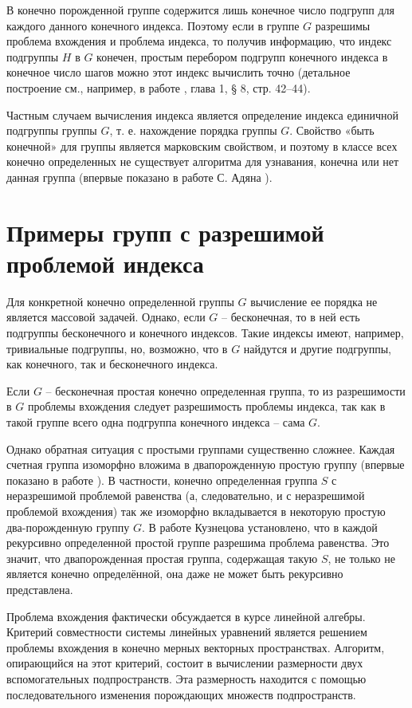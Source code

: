 \documentclass[twoside]{mfitjournal}
\begin{document}
В конечно порожденной группе содержится лишь конечное число подгрупп для каждого данного конечного индекса. Поэтому если в группе $G$ разрешимы проблема вхождения и проблема индекса, то получив информацию, что индекс подгруппы $H$ в $G$ конечен, простым перебором подгрупп конечного индекса в конечное число шагов можно этот индекс вычислить точно (детальное построение см., например, в работе \cite{Gor}, глава 1, § 8, стр. 42–44). 

Частным случаем вычисления индекса является определение индекса единичной подгруппы группы $G$, т. е. нахождение порядка группы $G$. Свойство «быть конечной» для группы является марковским свойством, и поэтому в классе всех конечно определенных не существует алгоритма  для узнавания, конечна или нет данная группа (впервые показано в работе С. Адяна \cite{Adyan}).

\section*{Примеры групп с разрешимой проблемой индекса}

Для конкретной конечно определенной группы $G$ вычисление ее порядка не является массовой задачей. Однако, если $G$ – бесконечная, то в ней есть подгруппы бесконечного и конечного индексов. Такие индексы имеют, например, тривиальные подгруппы, но, возможно, что в $G$ найдутся и  другие подгруппы, как конечного, так и бесконечного индекса. 
 
Если $G$ – бесконечная простая конечно определенная группа, то из разрешимости в $G$ проблемы вхождения следует разрешимость проблемы индекса, так как в такой группе всего одна подгруппа конечного индекса – сама $G$.
 
Однако обратная ситуация с простыми группами существенно сложнее. Каждая счетная группа изоморфно вложима в двапорожденную простую группу (впервые показано в работе \cite{Gor2}). В частности, конечно определенная группа $S$ с неразрешимой проблемой равенства (а, следовательно, и с неразрешимой проблемой вхождения) так же изоморфно вкладывается в некоторую простую два-порожденную группу $G$. В работе Кузнецова \cite{Kuz} установлено, что в каждой рекурсивно определенной простой группе разрешима проблема равенства. Это значит, что двапорожденная простая группа, содержащая такую $S$,   не только не является конечно определённой, она даже не может быть рекурсивно представлена.

Проблема вхождения фактически обсуждается в курсе линейной алгебры. Критерий совместности системы линейных уравнений является решением проблемы вхождения в конечно мерных векторных пространствах. Алгоритм, опирающийся на этот критерий,  состоит в вычислении размерности двух вспомогательных подпространств. Эта размерность находится с помощью последовательного изменения порождающих множеств подпространств.
\end{document}
